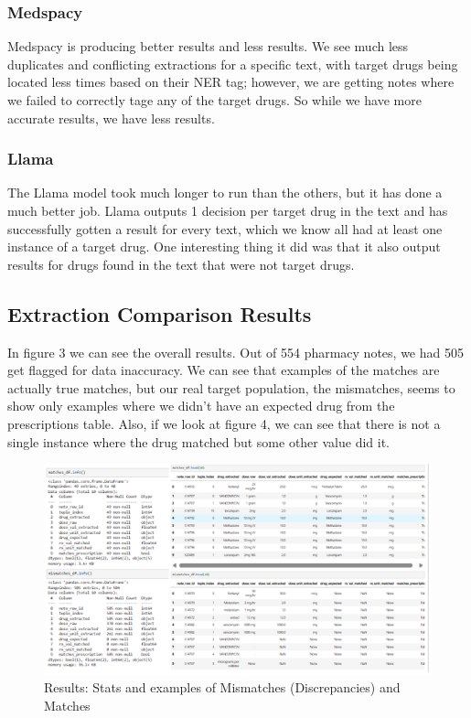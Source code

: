 \documentclass[sigconf,nonacm]{acmart} %
\begin{document}
\subsubsection{Medspacy}
Medspacy is producing better results and less results. We see much less duplicates and conflicting extractions for a specific text, with target drugs being located less times based on their NER tag; however, we are getting notes where we failed to correctly tage any of the target drugs. So while we have more accurate results, we have less results.

\subsubsection{Llama}
The Llama model took much longer to run than the others, but it has done a much better job. Llama outputs 1 decision per target drug in the text and has successfully gotten a result for every text, which we know all had at least one instance of a target drug. One interesting thing it did was that it also output results for drugs found in the text that were not target drugs.

\subsection{Extraction Comparison Results}
In figure 3 we can see the overall results. Out of 554 pharmacy notes, we had 505 get flagged for data inaccuracy. We can see that examples of the matches are actually true matches, but our real target population, the mismatches, seems to show only examples where we didn't have an expected drug from the prescriptions table. Also, if we look at figure 4, we can see that there is not a single instance where the drug matched but some other value did it.

\begin{figure}[t]
  \centering
  \includegraphics[width=\linewidth]{results.png}
  \caption{Results: Stats and examples of Mismatches (Discrepancies) and Matches}
  \label{fig:results}
\end{figure}
\end{document}
